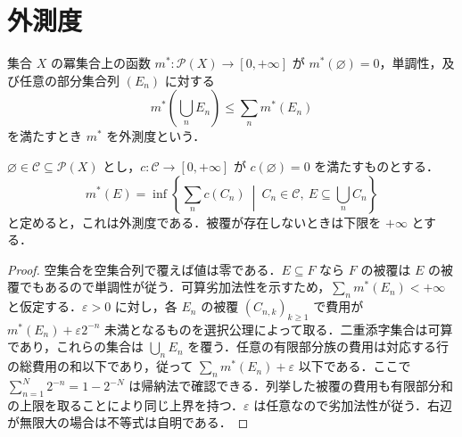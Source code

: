 \section{外測度}
\begin{defn}[外測度]
集合 $X$ の冪集合上の函数 $m^*:\mathcal P(X)\to[0,+\infty]$ が $m^*(\varnothing)=0$，単調性，及び任意の部分集合列 $(E_n)$ に対する
\[
 m^*\left(\bigcup_n E_n\right)\leq\sum_n m^*(E_n)
\]
を満たすとき $m^*$ を外測度という．
\end{defn}
\begin{prop}[被覆による外測度]
$\varnothing\in\mathcal C\subseteq\mathcal P(X)$ とし，$c:\mathcal C\to[0,+\infty]$ が $c(\varnothing)=0$ を満たすものとする．
\[
 m^*(E)=\inf\left\{\sum_n c(C_n)\ \middle|\ C_n\in\mathcal C,\ E\subseteq\bigcup_n C_n\right\}
\]
と定めると，これは外測度である．被覆が存在しないときは下限を $+\infty$ とする．
\end{prop}
\begin{proof}
空集合を空集合列で覆えば値は零である．$E\subseteq F$ なら $F$ の被覆は $E$ の被覆でもあるので単調性が従う．可算劣加法性を示すため，$\sum_n m^*(E_n)<+\infty$ と仮定する．$\varepsilon>0$ に対し，各 $E_n$ の被覆 $(C_{n,k})_{k\geq1}$ で費用が $m^*(E_n)+\varepsilon 2^{-n}$ 未満となるものを選択公理によって取る．二重添字集合は可算であり，これらの集合は $\bigcup_nE_n$ を覆う．任意の有限部分族の費用は対応する行の総費用の和以下であり，従って $\sum_n m^*(E_n)+\varepsilon$ 以下である．ここで $\sum_{n=1}^N2^{-n}=1-2^{-N}$ は帰納法で確認できる．列挙した被覆の費用も有限部分和の上限を取ることにより同じ上界を持つ．$\varepsilon$ は任意なので劣加法性が従う．右辺が無限大の場合は不等式は自明である．
\end{proof}

